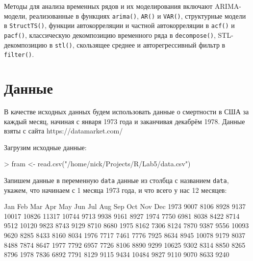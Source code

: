 \documentclass[a4paper]{extarticle}
\begin{document}
Методы для анализа временных рядов и их моделирования включают ARIMA-модели, реализованные в функциях \texttt{arima()}, \texttt{AR()} и \texttt{VAR()}, структурные модели в \texttt{StructTS()}, функции автокорреляции и частной автокорреляции в \texttt{acf()} и \texttt{pacf()}, классическую декомпозицию временного ряда в \texttt{decompose()}, STL-декомпозицию в \texttt{stl()}, скользящее среднее и авторегрессивный фильтр в \texttt{filter()}.

\section{Данные}

В качестве исходных данных будем использовать данные о смертности в США за каждый месяц, начиная с января 1973 года и заканчивая декабрём 1978. Данные взяты с сайта https://datamarket.com/

Загрузим исходные данные:

\begin{Schunk}
\begin{Sinput}
> fram <- read.csv("/home/nick/Projects/R/Lab5/data.csv")
\end{Sinput}
\end{Schunk}

Запишем данные в переменную \texttt{data} данные из столбца с названием \texttt{data}, укажем, что начинаем с 1 месяца 1973 года, и что всего у нас 12 месяцев:
\begin{Schunk}
\begin{Soutput}
       Jan   Feb   Mar   Apr   May   Jun   Jul   Aug   Sep   Oct   Nov   Dec
1973  9007  8106  8928  9137 10017 10826 11317 10744  9713  9938  9161  8927
1974  7750  6981  8038  8422  8714  9512 10120  9823  8743  9129  8710  8680
1975  8162  7306  8124  7870  9387  9556 10093  9620  8285  8433  8160  8034
1976  7717  7461  7776  7925  8634  8945 10078  9179  8037  8488  7874  8647
1977  7792  6957  7726  8106  8890  9299 10625  9302  8314  8850  8265  8796
1978  7836  6892  7791  8129  9115  9434 10484  9827  9110  9070  8633  9240
\end{Soutput}
\end{Schunk}


\end{document}
